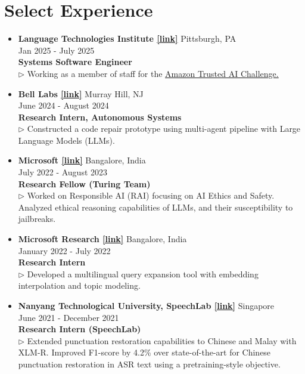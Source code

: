 \documentclass[11pt,letterpaper]{article}
\begin{document}
    \section*{Select Experience}
    \begin{itemize}[leftmargin=*,label={},itemsep=4pt]
        \item \textbf{Language Technologies Institute  \href{https://lti.cs.cmu.edu}{[link]}} \hfill Pittsburgh, PA\\
            \hfill Jan 2025 - July 2025\\
            \textbf{\textit{} Systems Software Engineer}\\
            $\triangleright$ Working as a member of staff for the \href{https://www.amazon.science/nova-ai-challenge}{Amazon Trusted AI Challenge.}\\
        \item \textbf{Bell Labs  \href{https://www.bell-labs.com/}{[link]}} \hfill Murray Hill, NJ\\
            \hfill June 2024 - August 2024\\
            \textbf{\textit{} Research Intern, Autonomous Systems}\\
            $\triangleright$ Constructed a code repair prototype using multi-agent pipeline with Large Language Models (LLMs).\\
        \item \textbf{Microsoft  \href{https://www.microsoft.com/en-in/research/theme/artificial-intelligence/}{[link]}} \hfill Bangalore, India\\
            \hfill July 2022 - August 2023\\
            \textbf{\textit{} Research Fellow (Turing Team)}\\
            $\triangleright$ Worked on Responsible AI (RAI) focusing on AI Ethics and Safety. Analyzed ethical reasoning capabilities of LLMs, and their susceptibility to jailbreaks.\\
        \item \textbf{Microsoft Research  \href{https://www.microsoft.com/en-us/research/}{[link]}} \hfill Bangalore, India\\
            \hfill January 2022 - July 2022\\
            \textbf{\textit{} Research Intern}\\
            $\triangleright$ Developed a multilingual query expansion tool with embedding interpolation and topic modeling.\\
        \item \textbf{Nanyang Technological University, SpeechLab  \href{https://www.ntu.edu.sg/speechlab}{[link]}} \hfill Singapore\\
            \hfill June 2021 - December 2021\\
            \textbf{\textit{} Research Intern (SpeechLab)}\\
            $\triangleright$ Extended punctuation restoration capabilities to Chinese and Malay with XLM-R. Improved F1-score by 4.2\% over state-of-the-art for Chinese punctuation restoration in ASR text using a pretraining-style objective.\\
    \end{itemize}
    
\end{document}
